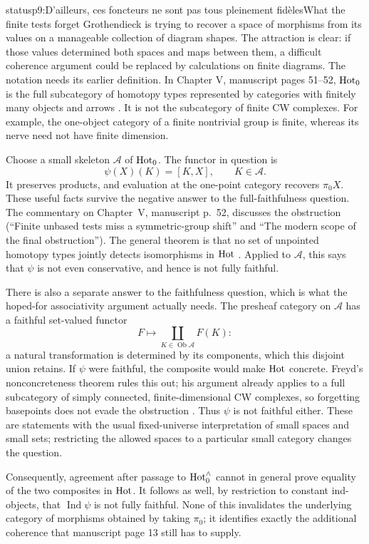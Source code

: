 \begin{dcomment}{status}{p9:D'ailleurs, ces foncteurs ne sont pas tous pleinement fidèles}{What the finite tests forget}
Grothendieck is trying to recover a space of morphisms from its values on a manageable collection of diagram shapes. The attraction is clear: if those values determined both spaces and maps between them, a difficult coherence argument could be replaced by calculations on finite diagrams. The notation needs its earlier definition. In Chapter V, manuscript pages 51--52, $\mathrm{Hot}_0$ is the full subcategory of homotopy types represented by categories with finitely many objects and arrows \citep[Chapter V, printed pp.~31--32]{GrothendieckDerivateursV}. It is not the subcategory of finite CW complexes. For example, the one-object category of a finite nontrivial group is finite, whereas its nerve need not have finite dimension.

Choose a small skeleton $\mathcal A$ of $\mathrm{Hot}_0$. The functor in question is
\[
 \psi(X)(K)=[K,X],\qquad K\in\mathcal A.
\]
It preserves products, and evaluation at the one-point category recovers $\pi_0X$. These useful facts survive the negative answer to the full-faithfulness question. The commentary on Chapter~V, manuscript p.~52, discusses the obstruction (``Finite unbased tests miss a symmetric-group shift'' and ``The modern scope of the final obstruction''). The general theorem is that no set of unpointed homotopy types jointly detects isomorphisms in $\mathrm{Hot}$ \citep[Theorem~2.1]{ArlinChristensen2023}. Applied to $\mathcal A$, this says that $\psi$ is not even conservative, and hence is not fully faithful.

There is also a separate answer to the faithfulness question, which is what the hoped-for associativity argument actually needs. The presheaf category on $\mathcal A$ has a faithful set-valued functor
\[
 F\longmapsto\coprod_{K\in\operatorname{Ob}\mathcal A}F(K):
\]
a natural transformation is determined by its components, which this disjoint union retains. If $\psi$ were faithful, the composite would make $\mathrm{Hot}$ concrete. Freyd's nonconcreteness theorem rules this out; his argument already applies to a full subcategory of simply connected, finite-dimensional CW complexes, so forgetting basepoints does not evade the obstruction \citep[pp.~1 and 5 of the 2004 reprint]{Freyd1970}. Thus $\psi$ is not faithful either. These are statements with the usual fixed-universe interpretation of small spaces and small sets; restricting the allowed spaces to a particular small category changes the question.

Consequently, agreement after passage to $\mathrm{Hot}_0^{\wedge}$ cannot in general prove equality of the two composites in $\mathrm{Hot}$. It follows as well, by restriction to constant ind-objects, that $\operatorname{Ind}\psi$ is not fully faithful. None of this invalidates the underlying category of morphisms obtained by taking $\pi_0$; it identifies exactly the additional coherence that manuscript page 13 still has to supply.
\end{dcomment}


